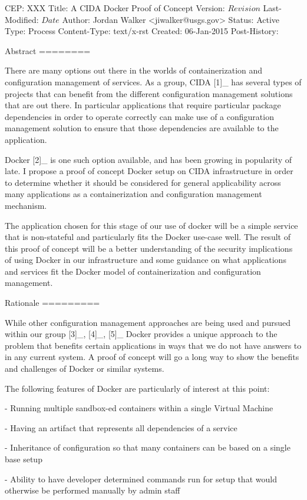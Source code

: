 CEP: XXX
Title: A CIDA Docker Proof of Concept
Version: $Revision$
Last-Modified: $Date$
Author: Jordan Walker <jiwalker@usgs.gov>
Status: Active
Type: Process
Content-Type: text/x-rst
Created: 06-Jan-2015
Post-History: 


Abstract
========

There are many options out there in the worlds of containerization and
configuration management of services.  As a group, CIDA [1]_ has several
types of projects that can benefit from the different configuration
management solutions that are out there.  In particular applications that
require particular package dependencies in order to operate correctly can
make use of a configuration management solution to ensure that those
dependencies are available to the application.

Docker [2]_ is one such option available, and has been growing in popularity
of late.  I propose a proof of concept Docker setup on CIDA infrastructure
in order to determine whether it should be considered for general
applicability across many applications as a containerization and
configuration management mechanism.

The application chosen for this stage of our use of docker will be a simple
service that is non-stateful and particularly fits the Docker use-case well.
The result of this proof of concept will be a better understanding of the
security implications of using Docker in our infrastructure and some
guidance on what applications and services fit the Docker model of
containerization and configuration management.

Rationale
=========

While other configuration management approaches are being used and pursued
within our group [3]_, [4]_, [5]_ Docker provides a unique approach to the
problem that benefits certain applications in ways that we do not have
answers to in any current system.  A proof of concept will go a long way
to show the benefits and challenges of Docker or similar systems.

The following features of Docker are particularly of interest at this point:

- Running multiple sandbox-ed containers within a single Virtual Machine

- Having an artifact that represents all dependencies of a service

- Inheritance of configuration so that many containers can be based on a
  single base setup

- Ability to have developer determined commands run for setup that would
  otherwise be performed manually by admin staff

